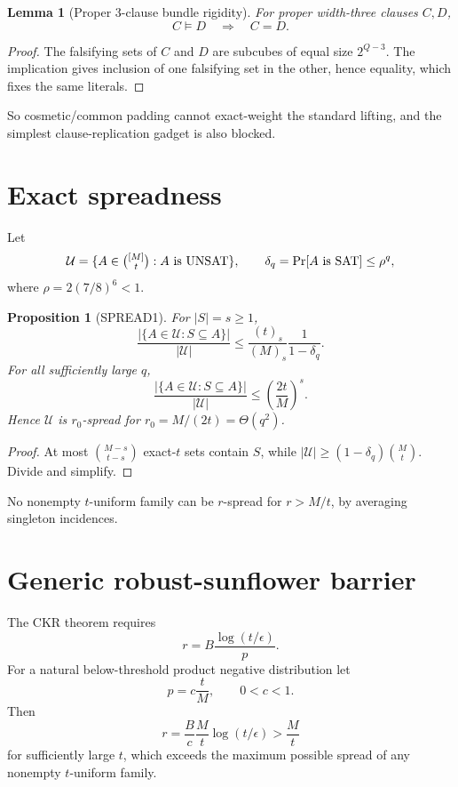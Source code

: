 \documentclass[11pt]{article}
\newtheorem{proposition}{Proposition}
\newtheorem{lemma}{Lemma}
\begin{document}
\begin{lemma}[Proper 3-clause bundle rigidity]
For proper width-three clauses \(C,D\),
\[
C\models D\quad\Longrightarrow\quad C=D.
\]
\end{lemma}
\begin{proof}
The falsifying sets of \(C\) and \(D\) are subcubes of equal size \(2^{Q-3}\). The implication gives inclusion of one falsifying set in the other, hence equality, which fixes the same literals.
\end{proof}

So cosmetic/common padding cannot exact-weight the standard lifting, and the simplest clause-replication gadget is also blocked.

\section{Exact spreadness}

Let
\[
\mathcal U=\{A\in\tbinom{[M]}t:A\text{ is UNSAT}\},\qquad
\delta_q=\Pr[A\text{ is SAT}]\le\rho^q,
\]
where \(\rho=2(7/8)^6<1\).

\begin{proposition}[SPREAD1]
For \(|S|=s\ge1\),
\[
\frac{|\{A\in\mathcal U:S\subseteq A\}|}{|\mathcal U|}
\le
\frac{(t)_s}{(M)_s}\frac1{1-\delta_q}.
\]
For all sufficiently large \(q\),
\[
\frac{|\{A\in\mathcal U:S\subseteq A\}|}{|\mathcal U|}
\le
\left(\frac{2t}{M}\right)^s.
\]
Hence \(\mathcal U\) is \(r_0\)-spread for \(r_0=M/(2t)=\Theta(q^2)\).
\end{proposition}
\begin{proof}
At most \(\binom{M-s}{t-s}\) exact-\(t\) sets contain \(S\), while
\(|\mathcal U|\ge(1-\delta_q)\binom Mt\). Divide and simplify.
\end{proof}

No nonempty \(t\)-uniform family can be \(r\)-spread for \(r>M/t\), by averaging singleton incidences.

\section{Generic robust-sunflower barrier}

The CKR theorem requires
\[
r=B\frac{\log(t/\epsilon)}p.
\]
For a natural below-threshold product negative distribution let
\[
p=c\frac tM,\qquad 0<c<1.
\]
Then
\[
r=\frac Bc\frac Mt\log(t/\epsilon)>\frac Mt
\]
for sufficiently large \(t\), which exceeds the maximum possible spread of any nonempty \(t\)-uniform family.
\end{document}
